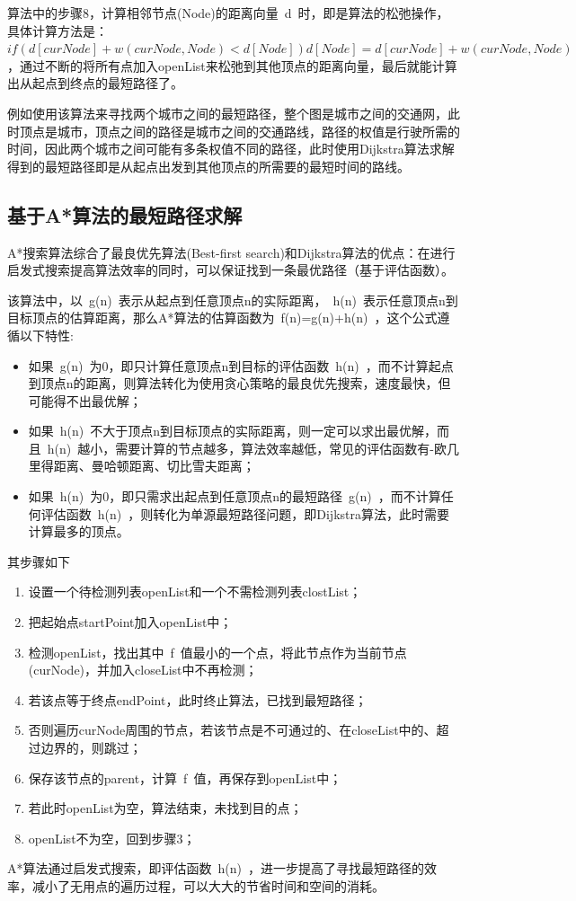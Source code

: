 \par 算法中的步骤8，计算相邻节点(Node)的距离向量~d~时，即是算法的松弛操作，具体计算方法是：$if (d[curNode] + w(curNode, Node) < d[Node]) d[Node] = d[curNode] + w(curNode, Node)$，通过不断的将所有点加入openList来松弛到其他顶点的距离向量，最后就能计算出从起点到终点的最短路径了。
\par 例如使用该算法来寻找两个城市之间的最短路径，整个图是城市之间的交通网，此时顶点是城市，顶点之间的路径是城市之间的交通路线，路径的权值是行驶所需的时间，因此两个城市之间可能有多条权值不同的路径，此时使用Dijkstra算法求解得到的最短路径即是从起点出发到其他顶点的所需要的最短时间的路线。

\subsection{基于A*算法的最短路径求解}
\label{section:A*algorithm_exp}
\par A*搜索算法综合了最良优先算法(Best-first search)和Dijkstra算法的优点：在进行启发式搜索提高算法效率的同时，可以保证找到一条最优路径（基于评估函数）。
\par 该算法中，以~g(n)~表示从起点到任意顶点n的实际距离，~h(n)~表示任意顶点n到目标顶点的估算距离，那么A*算法的估算函数为~f(n)=g(n)+h(n)~，这个公式遵循以下特性:
\begin{itemize}
    \item 如果~g(n)~为0，即只计算任意顶点n到目标的评估函数~h(n)~，而不计算起点到顶点n的距离，则算法转化为使用贪心策略的最良优先搜索，速度最快，但可能得不出最优解；
    \item 如果~h(n)~不大于顶点n到目标顶点的实际距离，则一定可以求出最优解，而且~h(n)~越小，需要计算的节点越多，算法效率越低，常见的评估函数有-欧几里得距离、曼哈顿距离、切比雪夫距离；
    \item 如果~h(n)~为0，即只需求出起点到任意顶点n的最短路径~g(n)~，而不计算任何评估函数~h(n)~，则转化为单源最短路径问题，即Dijkstra算法，此时需要计算最多的顶点。
\end{itemize}
\par 其步骤如下
\begin{enumerate}
    \item 设置一个待检测列表openList和一个不需检测列表clostList；
    \item 把起始点startPoint加入openList中；
    \item 检测openList，找出其中~f~值最小的一个点，将此节点作为当前节点(curNode)，并加入closeList中不再检测；
    \item 若该点等于终点endPoint，此时终止算法，已找到最短路径；
    \item 否则遍历curNode周围的节点，若该节点是不可通过的、在closeList中的、超过边界的，则跳过；
    \item 保存该节点的parent，计算~f~值，再保存到openList中；
    \item 若此时openList为空，算法结束，未找到目的点；
    \item openList不为空，回到步骤3；
\end{enumerate}
\par A*算法通过启发式搜索，即评估函数~h(n)~，进一步提高了寻找最短路径的效率，减小了无用点的遍历过程，可以大大的节省时间和空间的消耗。

